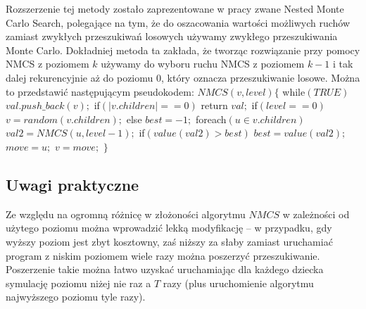 \documentclass{pracamgr}
\begin{document}
     Rozszerzenie tej metody zostało zaprezentowane w pracy \cite{NMCS} zwane Nested Monte Carlo Search, polegające na tym, że do oszacowania
     wartości możliwych ruchów zamiast zwykłych przeszukiwań losowych używamy zwykłego przeszukiwania Monte Carlo.
     Dokładniej metoda ta zakłada, że tworząc rozwiązanie przy pomocy NMCS z poziomem $k$ używamy do wyboru ruchu NMCS z poziomem $k-1$ i tak dalej rekurencyjnie
     aż do poziomu $0$, który oznacza przeszukiwanie losowe. Można to przedstawić następującym pseudokodem:\newline\newline
     \hspace*{100pt}$NMCS(v,level)\{$\newline
     \hspace*{116pt}	while$(TRUE)$\newline
     \hspace*{132pt}		$val.push\_back(v);$\newline
     \hspace*{132pt}		if$(|v.children|==0)$ return $val;$\newline
     \hspace*{132pt}		if$(level==0)$\newline
     \hspace*{148pt}			$v=random(v.children);$\newline
     \hspace*{132pt}		else\newline
     \hspace*{148pt}			$best=-1;$\newline    
     \hspace*{148pt}			foreach$(u\in v.children)$\newline
     \hspace*{164pt}				$val2=NMCS(u,level-1);$\newline
     \hspace*{164pt}				if$(value(val2)>best)$\newline
     \hspace*{180pt}					$best=value(val2);$\newline
     \hspace*{180pt}					$move=u;$\newline
     \hspace*{148pt}			$v=move;$\newline
     \hspace*{100pt}$\}$
    \subsection{Uwagi praktyczne}
     Ze względu na ogromną różnicę w złożoności algorytmu $NMCS$ w zależności od użytego poziomu można wprowadzić lekką modyfikację -- w przypadku,
     gdy wyższy poziom jest zbyt kosztowny, zaś niższy za słaby zamiast uruchamiać program z niskim poziomem wiele razy można poszerzyć przeszukiwanie.
     Poszerzenie takie można łatwo uzyskać uruchamiając dla każdego dziecka symulację poziomu niżej nie raz a $T$ razy
     (plus uruchomienie algorytmu najwyższego poziomu tyle razy).
     
\end{document}
